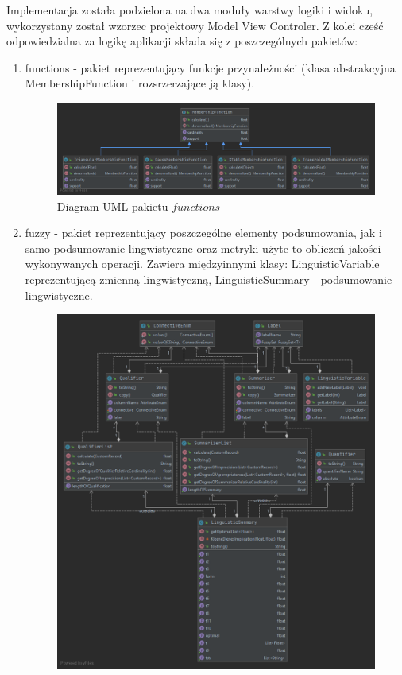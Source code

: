 \documentclass{classrep}
\begin{document}
Implementacja została podzielona na dwa moduły warstwy logiki i widoku, wykorzystany został wzorzec projektowy Model View Controler. Z kolei cześć odpowiedzialna za logikę aplikacji składa się z poszczególnych pakietów:
\begin{enumerate}
  \item functions - pakiet reprezentujący funkcje przynależności (klasa abstrakcyjna MembershipFunction i rozsrzerzające ją klasy). 
  \begin{figure}[H]
    \centering
    \includegraphics[scale = 0.3]{fun}
    \caption{Diagram UML pakietu \(functions\)}
  \end{figure}
  \item fuzzy - pakiet reprezentujący poszczególne elementy podsumowania, jak i samo podsumowanie lingwistyczne oraz metryki użyte to obliczeń jakości wykonywanych operacji. Zawiera międzyinnymi klasy: LinguisticVariable reprezentującą zmienną lingwistyczną, LinguisticSummary - podsumowanie lingwistyczne.
  \begin{figure}[H]    
    \centering
    \includegraphics[scale = 0.3]{fuzzy}

\end{figure}
\end{enumerate}
\end{document}

